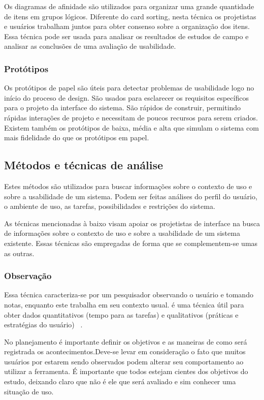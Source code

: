 	Os diagramas de afinidade são utilizados para organizar uma grande quantidade de itens em grupos lógicos. Diferente do card sorting, nesta técnica os projetistas e usuários trabalham juntos para obter consenso sobre a organização dos itens. Essa técnica pode ser usada para analisar os resultados de estudos de campo e analisar as conclusões de uma avaliação de usabilidade.

\subsubsection{Protótipos}

	Os protótipos de papel são úteis para detectar problemas de usabilidade logo no início do proceso de design. São usados para esclarecer os requisitos específicos para o projeto da interface do sistema.
	São rápidos de construir, permitindo rápidas interações de projeto e necessitam de poucos recursos para serem criados. 
	Existem também os protótipos de baixa, média e alta que simulam o sistema com mais fidelidade do que os protótipos em papel. 


\subsection{Métodos e técnicas de análise}

Estes métodos são utilizados para buscar informações sobre o contexto de uso e sobre a usabilidade de um sistema. Podem ser feitas análises do perfil do usuário, o ambiente de uso, as tarefas, possibilidades e restrições do sistema.

As técnicas mencionadas à baixo visam apoiar os projetistas de interface na busca de informações sobre o contexto de uso e sobre a usabilidade de um sistema existente. Essas técnicas são empregadas de forma que se complementem-se umas as outras.

\subsubsection{Observação}

	Essa técnica caracteriza-se por um pesquisador observando o usuário e tomando notas, enquanto este trabalha em seu contexto usual. é uma técnica útil para obter dados quantitativos (tempo para as tarefas) e qualitativos (práticas e estratégias do usuário) ~\cite{cybis2010}.

	No planejamento é importante definir os objetivos e as maneiras de como será registrada os acontecimentos.Deve-se levar em consideração o fato que muitos usuários por estarem sendo observados podem alterar seu comportamento ao utilizar a ferramenta. É importante que todos estejam cientes dos objetivos do estudo, deixando claro que não é ele que será avaliado e sim conhecer uma situação de uso.

